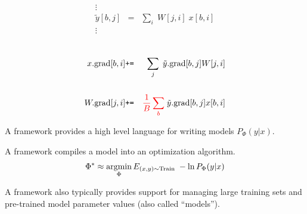 {
\vspace{-3ex}
\begin{eqnarray*}
\vdots \\
  \tilde{y}[b,j] & = & \sum_i\;W[j,i]\;x[b,i] \\
  \vdots
  \end{eqnarray*}

  \begin{eqnarray*}
  \\
  x.\mathrm{grad}[b,i] & \mbox{\tt +=} & \sum_j\;\tilde{y}.\mathrm{grad}[b,j]W[j,i] \\
  \\
  W.\mathrm{grad}[j,i] & \mbox{\tt +=} & {\color{red} \frac{1}{B} \sum_b}\;\tilde{y}.\mathrm{grad}[b,j]x[b,i]
\end{eqnarray*}


A framework provides a high level language for writing models $P_\Phi(y|x)$.

\vfill
A framework compiles a model into an optimization algorithm.
\vfill
{\color{red} $$\Phi^* \approx \operatorname*{argmin}_\Phi E_{(x,y) \sim \mathrm{Train}} \; -\ln P_\Phi(y|x)$$}

\vfill
A framework also typically provides support for managing large training sets and pre-trained model parameter values (also called ``models'').

 
}

